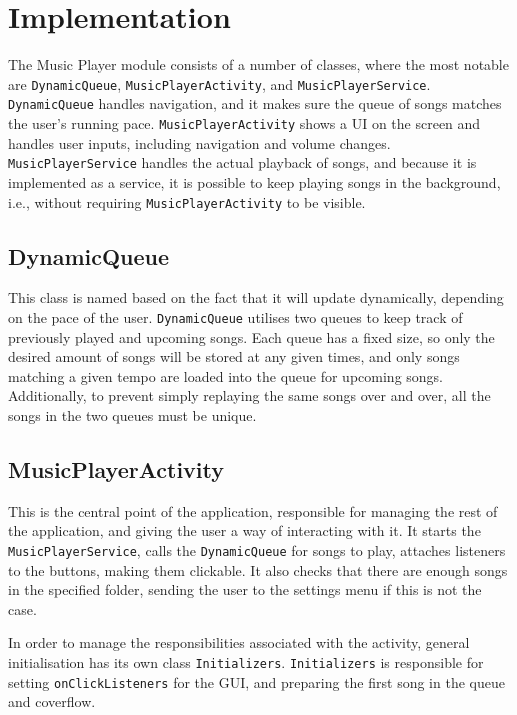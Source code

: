 \section{Implementation}
The Music Player module consists of a number of classes, where the most notable are \texttt{DynamicQueue}, \texttt{MusicPlayerActivity}, and \texttt{MusicPlayerService}. \texttt{DynamicQueue} handles navigation, and it makes sure the queue of songs matches the user's running pace. \texttt{MusicPlayerActivity} shows a UI on the screen and handles user inputs, including navigation and volume changes. \texttt{MusicPlayerService} handles the actual playback of songs, and because it is implemented as a service, it is possible to keep playing songs in the background, i.e., without requiring \texttt{MusicPlayerActivity} to be visible.

\subsection{DynamicQueue}
\label{sec:dynamicQueue}
This class is named based on the fact that it will update dynamically, depending on the pace of the user. \texttt{DynamicQueue} utilises two queues to keep track of previously played and upcoming songs.
Each queue has a fixed size, so only the desired amount of songs will be stored at any given times, and only songs matching a given tempo are loaded into the queue for upcoming songs. 
Additionally, to prevent simply replaying the same songs over and over, all the songs in the two queues must be unique.

\subsection{MusicPlayerActivity}
This is the central point of the application, responsible for managing the rest of the application, and giving the user a way of interacting with it. It starts the \texttt{MusicPlayerService}, calls the \texttt{DynamicQueue} for songs to play, attaches listeners to the buttons, making them clickable. It also checks that there are enough songs in the specified folder, sending the user to the settings menu if this is not the case.

In order to manage the responsibilities associated with the activity, general initialisation has its own class \texttt{Initializers}. \texttt{Initializers} is responsible for setting \texttt{onClickListeners} for the GUI, and preparing the first song in the queue and coverflow. 

